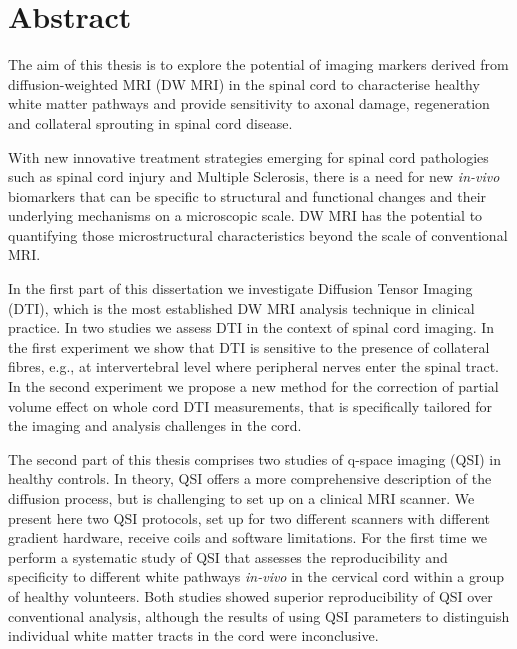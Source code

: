 

\begingroup
\let\clearpage\relax
\let\cleardoublepage\relax
\let\cleardoublepage\relax

\chapter*{Abstract} %
{\small
The aim of this thesis is to explore the potential of imaging markers derived from diffusion-weighted MRI (DW MRI) in the spinal cord to characterise healthy white matter pathways and provide sensitivity to axonal damage, regeneration and collateral sprouting in spinal cord disease. 


With new innovative treatment strategies emerging for spinal cord pathologies such as spinal cord injury and Multiple Sclerosis, there is a need for new \emph{in-vivo} biomarkers that can be specific to structural and functional changes and their underlying mechanisms on a microscopic scale. DW MRI has the potential to quantifying those microstructural characteristics beyond the scale of  conventional MRI.


In the first part of this dissertation we investigate Diffusion Tensor Imaging (DTI), which is the most established DW MRI analysis technique in clinical practice. In two studies we assess DTI in the context of spinal cord imaging. In the first experiment we show that DTI is sensitive to the presence of collateral fibres, e.g., at intervertebral level where peripheral nerves enter the spinal tract. In the second experiment we propose a new method for the correction of partial volume effect on whole cord DTI measurements, that is specifically tailored for the imaging and analysis challenges in the cord. 


The second part of this thesis comprises two studies of q-space imaging (QSI) in healthy controls. In theory, QSI offers a more comprehensive description of the diffusion process, but is challenging to set up on a clinical MRI scanner. We present here two QSI protocols, set up for two different scanners with different gradient hardware, receive coils and software limitations. For the first time we perform a systematic study of QSI that assesses the reproducibility and specificity to different white pathways \emph{in-vivo} in the cervical cord within a group of healthy volunteers. Both studies showed superior reproducibility of QSI over conventional analysis, although the results of using QSI parameters to distinguish individual white matter tracts in the cord were inconclusive.


}
